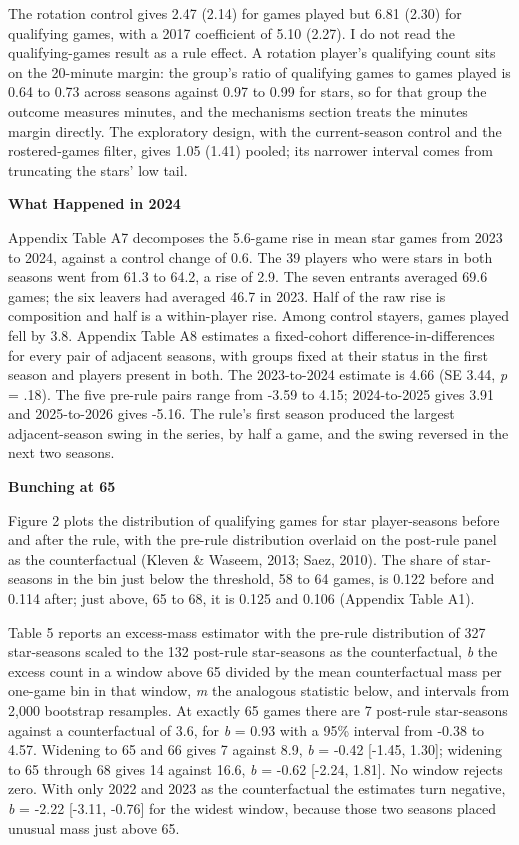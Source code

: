 \documentclass[12pt]{article}
\newcommand{\ltwo}[1]{\par\medskip\noindent\textbf{#1}\par\nopagebreak}
\begin{document}
The rotation control gives 2.47 (2.14) for games played but 6.81 (2.30) for qualifying games, with a 2017 coefficient of 5.10 (2.27). I do not read the qualifying-games result as a rule effect. A rotation player's qualifying count sits on the 20-minute margin: the group's ratio of qualifying games to games played is 0.64 to 0.73 across seasons against 0.97 to 0.99 for stars, so for that group the outcome measures minutes, and the mechanisms section treats the minutes margin directly. The exploratory design, with the current-season control and the rostered-games filter, gives 1.05 (1.41) pooled; its narrower interval comes from truncating the stars' low tail.


\ltwo{What Happened in 2024}


Appendix Table A7 decomposes the 5.6-game rise in mean star games from 2023 to 2024, against a control change of 0.6. The 39 players who were stars in both seasons went from 61.3 to 64.2, a rise of 2.9. The seven entrants averaged 69.6 games; the six leavers had averaged 46.7 in 2023. Half of the raw rise is composition and half is a within-player rise. Among control stayers, games played fell by 3.8. Appendix Table A8 estimates a fixed-cohort difference-in-differences for every pair of adjacent seasons, with groups fixed at their status in the first season and players present in both. The 2023-to-2024 estimate is 4.66 (SE 3.44, \emph{p} = .18). The five pre-rule pairs range from -3.59 to 4.15; 2024-to-2025 gives 3.91 and 2025-to-2026 gives -5.16. The rule's first season produced the largest adjacent-season swing in the series, by half a game, and the swing reversed in the next two seasons.


\ltwo{Bunching at 65}


Figure 2 plots the distribution of qualifying games for star player-seasons before and after the rule, with the pre-rule distribution overlaid on the post-rule panel as the counterfactual (Kleven \& Waseem, 2013; Saez, 2010). The share of star-seasons in the bin just below the threshold, 58 to 64 games, is 0.122 before and 0.114 after; just above, 65 to 68, it is 0.125 and 0.106 (Appendix Table A1).

Table 5 reports an excess-mass estimator with the pre-rule distribution of 327 star-seasons scaled to the 132 post-rule star-seasons as the counterfactual, \emph{b} the excess count in a window above 65 divided by the mean counterfactual mass per one-game bin in that window, \emph{m} the analogous statistic below, and intervals from 2,000 bootstrap resamples. At exactly 65 games there are 7 post-rule star-seasons against a counterfactual of 3.6, for \emph{b} = 0.93 with a 95\% interval from -0.38 to 4.57. Widening to 65 and 66 gives 7 against 8.9, \emph{b} = -0.42 [-1.45, 1.30]; widening to 65 through 68 gives 14 against 16.6, \emph{b} = -0.62 [-2.24, 1.81]. No window rejects zero. With only 2022 and 2023 as the counterfactual the estimates turn negative, \emph{b} = -2.22 [-3.11, -0.76] for the widest window, because those two seasons placed unusual mass just above 65.
\end{document}
